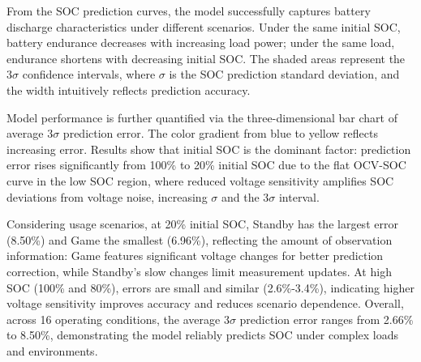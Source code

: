 \documentclass{mcmthesis}
\begin{document}
\begin{table}[htbp]
\centering
\caption{Discharge time  and the average $3\sigma$ prediction error}
\vspace{-0.4cm}
\label{tab:prediction_results}
\end{table}
From the SOC prediction curves, the model successfully captures battery discharge characteristics under different scenarios. Under the same initial SOC, battery endurance decreases with increasing load power; under the same load, endurance shortens with decreasing initial SOC. The shaded areas represent the $3\sigma$ confidence intervals, where $\sigma$ is the SOC prediction standard deviation, and the width intuitively reflects prediction accuracy.

Model performance is further quantified via the three-dimensional bar chart of average $3\sigma$ prediction error. The color gradient from blue to yellow reflects increasing error. Results show that initial SOC is the dominant factor: prediction error rises significantly from 100\% to 20\% initial SOC due to the flat OCV-SOC curve in the low SOC region, where reduced voltage sensitivity amplifies SOC deviations from voltage noise, increasing $\sigma$ and the $3\sigma$ interval.

Considering usage scenarios, at 20\% initial SOC, Standby has the largest error (8.50\%) and Game the smallest (6.96\%), reflecting the amount of observation information: Game features significant voltage changes for better prediction correction, while Standby’s slow changes limit measurement updates. At high SOC (100\% and 80\%), errors are small and similar (2.6\%-3.4\%), indicating higher voltage sensitivity improves accuracy and reduces scenario dependence. Overall, across 16 operating conditions, the average $3\sigma$ prediction error ranges from 2.66\% to 8.50\%, demonstrating the model reliably predicts SOC under complex loads and environments.
\end{document}
